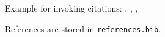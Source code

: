 Example for invoking citations: \cite{Bech:63}, \citet[291]{Bech:63}, \citep{Bech:63}, \citealt{Bech:63}

References are stored in \texttt{references.bib}.

